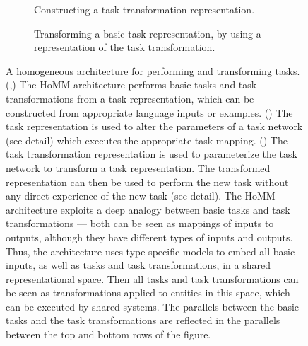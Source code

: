 \documentclass[12pt]{article}
\begin{document}
\begin{figure}[H]
{\begin{tikzpicture}[auto]
\end{tikzpicture}
}
\begin{subfigure}[t]{0.4\textwidth}
\vspace{-1em}
\caption{Constructing a task-transformation\phantom{blahblah} representation.}\label{fig:HoMM_architecture:constructing_meta}
\end{subfigure}%
\begin{subfigure}[t]{0.6\textwidth}
\vspace{-1em}
\caption{Transforming a basic task representation, by using a representation of the task transformation.}\label{fig:HoMM_architecture:performing_meta}
\end{subfigure}
\caption[Performing and transforming tasks with the HoMM architecture.]{A homogeneous architecture for performing and transforming tasks. (,) The HoMM architecture performs basic tasks and task transformations from a task representation, which can be constructed from appropriate language inputs or examples.  () The task representation is used to alter the parameters of a task network (see detail) which executes the appropriate task mapping. () The task transformation representation is used to parameterize the task network to transform a task representation. The transformed representation can then be used to perform the new task without any direct experience of the new task (see detail). The HoMM architecture exploits a deep analogy between basic tasks and task transformations --- both can be seen as mappings of inputs to outputs, although they have different types of inputs and outputs. Thus, the architecture uses type-specific models to embed all basic inputs, as well as tasks and task transformations, in a shared representational space. Then all tasks and task transformations can be seen as transformations applied to entities in this space, which can be executed by shared systems. The parallels between the basic tasks and the task transformations are reflected in the parallels between the top and bottom rows of the figure.} \label{fig:HoMM_architecture}
\end{figure}
\end{document}
